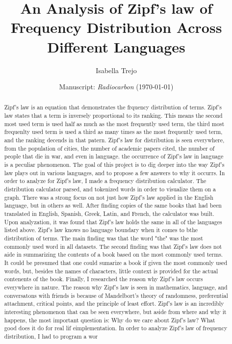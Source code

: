 \documentclass[a4paper,10pt]{article}
\title{An Analysis of Zipf's law of Frequency Distribution Across Different Languages}
\author{Isabella Trejo}
\date{\normalsize{Manuscript: \textit{Radiocarbon} (\today)}}
\begin{document}
\maketitle


\begin{abstract}
	Zipf's law is an equation that demonstrates the frquency distribution of terms. Zipf's law states that a term is inversely proportional to its ranking. This means the second most used term is used half as much as the most frequently used term, the third most frequenlty used term is used a third as many times as the most frequently used term, and the ranking decends in that patern. Zipf's law for distribution is seen everywhere, from the population of cities, the number of academic papers cited, the number of people that die in war, and even in language. the occurrence of Zipf's law in language is a peculiar phenomenon. The goal of this project is to dig deeper into the way Zipf's law plays out in various languages, and to propose a few answers to why it occurrs. In order to analyze for Zipf's law, I made a frequency distribution calculator. The distribution calculator parsed, and tokenized words in order to visualize them on a graph. There was a strong focus on not just how Zipf's law applied in the English language, but in others as well. After finding copies of the same books that had been translated in English, Spanish, Greek, Latin, and French, the calculator was built. Upon analyzation, it was found that Zipf's law holds the same in all of the languages listed above. Zipf's law knows no language boundary when it comes to bthe distribution of terms. The main finding was that the word "the" was the most commonly used word in all datasets. The second finding was that Zipf's law does not aide in summarizing the contents of a book based on the most commonly used terms. It could be presumed that one could sumarize a book if given the most commonly used words, but, besides the names of characters, little context is provided for the actual contenents of the book. Finally, I researched the reason why Zipf's law occurs everywhere in nature. The reason why Zipf's law is seen in mathematics, language, and conversatons with friends is because of Mandelbort's theory of randomness, preferential attachment, critical points, and the principle of least effort. Zipf's law is an incredibly interesting phenomenon that can be seen everywhere, but aside from where and why it happens, the most important question is: Why do we care about Zipf's law? What good does it do for real lif eimplementation.  In order to analyze Zipf’s law of frequency distribution, I had to program a wor
\end{abstract}
\end{document}
